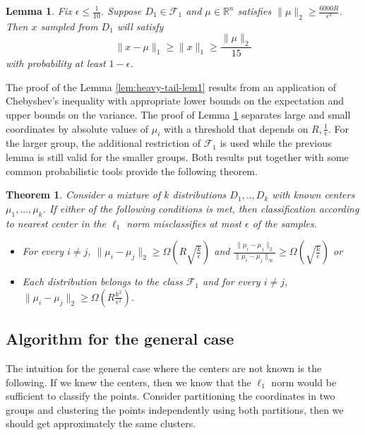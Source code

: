 \documentclass[11pt,letter]{article}
\newtheorem{theorem}{Theorem}
\newtheorem{lemma}{Lemma}
\begin{document}
\begin{lemma} \label{lem:heavy-tail-lem2}
Fix $\epsilon \leq \frac{1}{10}$. Suppose $D_1 \in \mathcal F_1$ and $\mu \in \mathbb{R}^n$ satisfies $\|\mu\|_2 \geq \frac{6000R}{\epsilon^2}$. Then $x$ sampled from $D_1$ will satisfy 
$$\|x - \mu\|_1 \geq \|x\|_1 \geq \frac{\|\mu\|_2}{15}$$
with probability at least $1-\epsilon$. 
\end{lemma}

The proof of the Lemma \ref{lem:heavy-tail-lem1} results from an application of Chebyshev's inequality with appropriate lower bounds on the expectation and upper bounds on the variance. The proof of Lemma \ref{lem:heavy-tail-lem2} separates large and small coordinates by absolute values of $\mu_i$ with a threshold that depends on $R, \frac{1}{\epsilon}$. For the larger group, the additional restriction of $\mathcal F_1$ is used while the previous lemma is still valid for the smaller groups. Both results put together with some common probabilistic tools provide the following theorem. 

\begin{theorem}
Consider a mixture of $k$ distributions $D_1,..,D_k$ with known centers $\mu_1,...,\mu_k$. If either of the following conditions is met, then classification according to nearest center in the $\ell_1$ norm misclassifies at most $\epsilon$ of the samples.

\begin{itemize}
	\item For every $i\not=j$, $\|\mu_i - \mu_j\|_2 \geq \Omega\left( R \sqrt{\frac{k}{\epsilon}}\right)$ and $\frac{\|\mu_i - \mu_j\|_2}{\|\mu_i - \mu_j\|_\infty} \geq \Omega \left( \sqrt{\frac{k}{\epsilon}}\right)$ or
	\item Each distribution belongs to the class $\mathcal F_1$ and for every $i\not= j$, $\|\mu_i - \mu_j\|_2 \geq \Omega\left(R\frac{k^2}{\epsilon^2}\right)$.
	
\end{itemize}
\end{theorem}

\subsection{Algorithm for the general case}

The intuition for the general case where the centers are not known is the following. If we knew the centers, then we know that the $\ell_1$ norm would be sufficient to classify the points. Consider partitioning the coordinates in two groups and clustering the points independently using both partitions, then we should get approximately the same clusters. 
\end{document}
